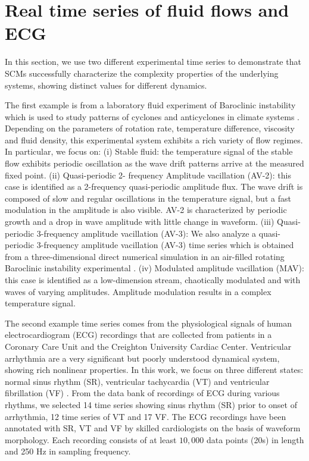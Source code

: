 \documentclass[12pt,aip,cha,reprint,nofootinbib]{revtex4-1}
\begin{document}
\section{Real time series of fluid flows and ECG} \label{sec:time}
In this section, we use two different experimental time series to demonstrate that SCMs successfully characterize the complexity properties of the underlying systems, showing distinct values for different dynamics. 

The first example is from a laboratory fluid experiment of Baroclinic instability which is used to study patterns of cyclones and anticyclones in climate systems \cite{Read_jfm_1992,ZouEPJST2008}. Depending on the parameters of rotation rate, temperature difference, viscosity and fluid density, this experimental system exhibits a rich variety of flow regimes. In particular, we focus on: (i) {Stable fluid:} the temperature signal of the stable flow exhibits periodic oscillation as the wave drift patterns arrive at the measured fixed point. (ii) {Quasi-periodic 2- frequency Amplitude vacillation (AV-2):} this case is identified as a 2-frequency quasi-periodic amplitude flux. The wave drift is composed of slow and regular oscillations in the temperature signal, but a fast modulation in the amplitude is also visible. AV-2 is characterized by periodic growth and a drop in wave amplitude with little change in waveform. (iii) {Quasi-periodic 3-frequency amplitude vacillation (AV-3): } We also analyze a quasi-periodic 3-frequency amplitude vacillation (AV-3) time series which is obtained from a three-dimensional direct numerical simulation in an air-filled rotating Baroclinic instability experimental \cite{Read_jfm_1992}. (iv) {Modulated amplitude vacillation (MAV):} this case is identified as a low-dimension stream, chaotically modulated and with waves of varying amplitudes. Amplitude modulation results in a complex temperature signal.

The second example time series comes from the physiological signals of human electrocardiogram (ECG) recordings that are collected from patients in a Coronary Care Unit and the Creighton University Cardiac Center. Ventricular arrhythmia are a very significant but poorly understood dynamical system, showing rich nonlinear properties. In this work, we focus on three different states: normal sinus rhythm (SR), ventricular tachycardia (VT) and ventricular fibrillation (VF) \cite{smallCSF2002}. From the data bank of recordings of ECG during various rhythms, we selected 14 time series showing sinus rhythm (SR) prior to onset of arrhythmia, 12 time series of VT and 17 VF. The ECG recordings have been annotated with SR, VT and VF by skilled cardiologists on the basis of waveform morphology. Each recording consists of at least $10,000$ data points (20s) in length and 250 Hz in sampling frequency. 
\end{document}

